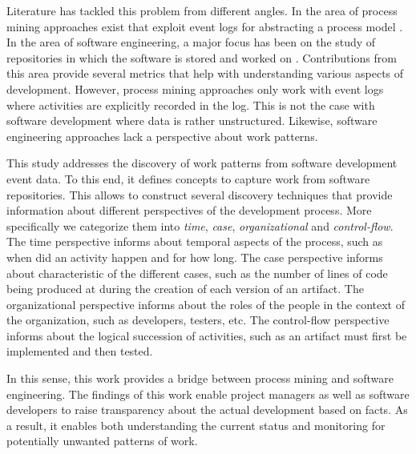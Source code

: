 Literature has tackled this problem from different angles. In the area of process mining approaches exist that exploit event logs for abstracting a process model \citep{Zerbino2021,vanZelst2021,DBLP:journals/tkde/AugustoCDRMMMS19,Rojas2016}. 
In the area of software engineering, a major focus has been on the study of repositories in which the software is stored and worked on \citep{Farias2016,Matthies2020,Barros2021}. Contributions from this area provide several metrics that help with understanding various aspects of development. 
However, process mining approaches only work with event logs where activities are explicitly recorded in the log. This is not the case with software development where data is rather unstructured. Likewise, software engineering approaches lack a perspective about work patterns. 


This study addresses the discovery of work patterns from software development event data. To this end, it defines concepts to capture work from software repositories. This allows to construct several discovery techniques that provide information about different perspectives of the development process. More specifically we categorize them into \emph{time}, \emph{case}, \emph{organizational} and \emph{control-flow}. The time perspective informs about temporal aspects of the process, such as when did an activity happen and for how long. The case perspective informs about characteristic of the different cases, such as the number of lines of code being produced at during the creation of each version of an artifact. The organizational perspective informs about the roles of the people in the context of the organization, such as developers, testers, etc. The control-flow perspective informs about the logical succession of activities, such as an artifact must first be implemented and then tested. 

In this sense, this work provides a bridge between process mining and software engineering. The findings of this work enable project managers as well as software developers to raise transparency about the actual development based on facts. As a result, it enables both understanding the current status and monitoring for potentially unwanted patterns of work.



